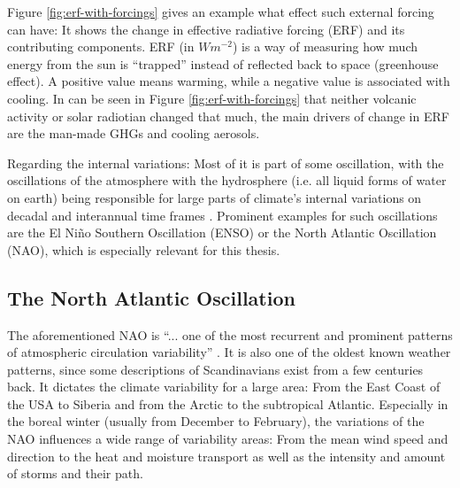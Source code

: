Figure \ref{fig:erf-with-forcings} gives an example what effect such external forcing can have: It shows the change in effective radiative forcing (ERF) and its contributing components. 
ERF (in $Wm^{-2}$) is a way of measuring how much energy from the sun is \enquote{trapped} instead of reflected back to space (greenhouse effect). 
A positive value means warming, while a negative value is associated with cooling. 
In can be seen in Figure \ref{fig:erf-with-forcings} that neither volcanic activity or solar radiotian changed that much, the main drivers of change in ERF are the man-made GHGs and cooling aerosols. \cite{intergovernmental_panel_on_climate_change_ipcc_climate_2023}

Regarding the internal variations: Most of it is part of some oscillation, with the oscillations of the atmosphere with the hydrosphere (i.e. all liquid forms of water on earth) being responsible for large parts of climate's internal variations on decadal and interannual time frames \cite{vietinghoffdiss}. 
Prominent examples for such oscillations are the El Niño Southern Oscillation (ENSO) or the North Atlantic Oscillation (NAO), which is especially relevant for this thesis. 


\subsection{The North Atlantic Oscillation}
\label{sec:nao}

The aforementioned NAO is \enquote{... one of the most recurrent and prominent patterns of atmospheric circulation variability} \cite{hurrell_overview_2003}. 
It is also one of the oldest known weather patterns, since some descriptions of Scandinavians exist from a few centuries back. 
It dictates the climate variability for a large area: From the East Coast of the USA to Siberia and from the Arctic to the subtropical Atlantic.
Especially in the boreal winter (usually from December to February), the variations of the NAO influences a wide range of variability areas: From the mean wind speed and direction to the heat and moisture transport as well as the intensity and amount of storms and their path. 

